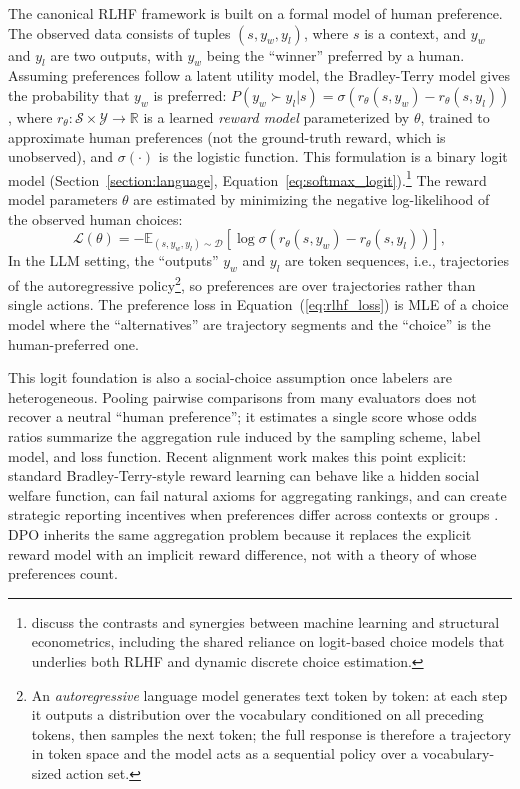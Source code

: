 The canonical RLHF framework is built on a formal model of human preference. The observed data consists of tuples $(s, y_w, y_l)$, where $s$ is a context, and $y_w$ and $y_l$ are two outputs, with $y_w$ being the ``winner'' preferred by a human. Assuming preferences follow a latent utility model, the Bradley-Terry model \citep{bradley1952rank} gives the probability that $y_w$ is preferred: $P(y_w \succ y_l | s) = \sigma(r_\theta(s, y_w) - r_\theta(s, y_l))$, where $r_\theta: \mathcal{S} \times \mathcal{Y} \to \mathbb{R}$ is a learned \textit{reward model} parameterized by $\theta$, trained to approximate human preferences (not the ground-truth reward, which is unobserved), and $\sigma(\cdot)$ is the logistic function. This formulation is a binary logit model (Section~\ref{section:language}, Equation~\ref{eq:softmax_logit}).\footnote{\citet{iskhakov2021} discuss the contrasts and synergies between machine learning and structural econometrics, including the shared reliance on logit-based choice models that underlies both RLHF and dynamic discrete choice estimation.} The reward model parameters $\theta$ are estimated by minimizing the negative log-likelihood of the observed human choices:
\begin{equation}
    \mathcal{L}(\theta) = -\mathbb{E}_{(s, y_w, y_l) \sim \mathcal{D}} \left[ \log \sigma \left( r_\theta(s, y_w) - r_\theta(s, y_l) \right) \right],
\label{eq:rlhf_loss}
\end{equation}
In the LLM setting, the ``outputs'' $y_w$ and $y_l$ are token sequences, i.e., trajectories of the autoregressive policy\footnote{An \emph{autoregressive} language model generates text token by token: at each step it outputs a distribution over the vocabulary conditioned on all preceding tokens, then samples the next token; the full response is therefore a trajectory in token space and the model acts as a sequential policy over a vocabulary-sized action set.}, so preferences are over trajectories rather than single actions. The preference loss in Equation~(\ref{eq:rlhf_loss}) is MLE of a choice model where the ``alternatives'' are trajectory segments and the ``choice'' is the human-preferred one.

This logit foundation is also a social-choice assumption once labelers are heterogeneous. Pooling pairwise comparisons from many evaluators does not recover a neutral ``human preference''; it estimates a single score whose odds ratios summarize the aggregation rule induced by the sampling scheme, label model, and loss function. Recent alignment work makes this point explicit: standard Bradley-Terry-style reward learning can behave like a hidden social welfare function, can fail natural axioms for aggregating rankings, and can create strategic reporting incentives when preferences differ across contexts or groups \citep{conitzer2024socialchoice,siththaranjan2024distributional,ge2024axioms,park2024heterogeneous}. DPO inherits the same aggregation problem because it replaces the explicit reward model with an implicit reward difference, not with a theory of whose preferences count.

